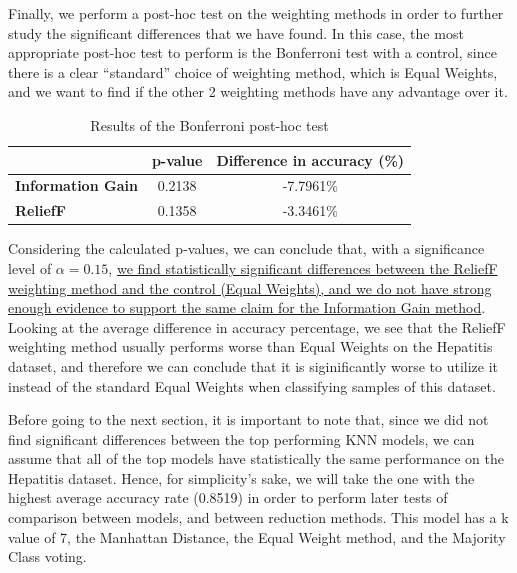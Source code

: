 Finally, we perform a post-hoc test on the weighting methods in order to further study the significant differences that we have found. In this case, the most appropriate post-hoc test to perform is the Bonferroni test with a control, since there is a clear ``standard'' choice of weighting method, which is Equal Weights, and we want to find if the other 2 weighting methods have any advantage over it.
\begin{table}[h!]
    \centering
    \small
    \begin{tabular}{|l|c|c|}
    \hline
                             & \textbf{p-value} & \textbf{Difference in accuracy (\%)} \\ \hline
    \textbf{Information Gain} & 0.2138           & -7.7961\%          \\ \hline
    \textbf{ReliefF}           & 0.1358           & -3.3461\%          \\ \hline
    \end{tabular}
    \caption{Results of the Bonferroni post-hoc test}
    \label{tab:knn:hep:posthoc}
\end{table}

Considering the calculated p-values, we can conclude that, with a significance level of $ \alpha = 0.15 $, \uline{we find statistically significant differences between the ReliefF weighting method and the control (Equal Weights), and we do not have strong enough evidence to support the same claim for the Information Gain method}. Looking at the average difference in accuracy percentage, we see that the ReliefF weighting method usually performs worse than Equal Weights on the Hepatitis dataset, and therefore we can conclude that it is siginificantly worse to utilize it instead of the standard Equal Weights when classifying samples of this dataset.

Before going to the next section, it is important to note that, since we did not find significant differences between the top performing KNN models, we can assume that all of the top models have statistically the same performance on the Hepatitis dataset. Hence, for simplicity's sake, we will take the one with the highest average accuracy rate (0.8519) in order to perform later tests of comparison between models, and between reduction methods. This model has a k value of 7, the Manhattan Distance, the Equal Weight method, and the Majority Class voting.

